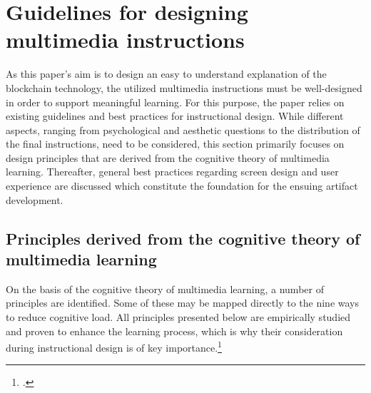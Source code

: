 \section{Guidelines for designing multimedia instructions} \label{sec:GuidelinesMultimediaInstr}
As this paper's aim is to design an easy to understand explanation of the blockchain technology, the utilized multimedia instructions must be well-designed in order to support meaningful learning. For this purpose, the paper relies on existing guidelines and best practices for instructional design. While different aspects, ranging from psychological and aesthetic questions to the distribution of the final instructions, need to be considered, this section primarily focuses on design principles that are derived from the cognitive theory of multimedia learning. Thereafter, general best practices regarding screen design and user experience are discussed which constitute the foundation for the ensuing artifact development.

\subsection{Principles derived from the cognitive theory of multimedia learning}
On the basis of the cognitive theory of multimedia learning, a number of principles are identified. Some of these may be mapped directly to the nine ways to reduce cognitive load. All principles presented below are empirically studied and proven to enhance the learning process, which is why their consideration during instructional design is of key importance.\footcites[Cf. for more detail][]{SordenCognitiveTheoryMultimedia2012}

